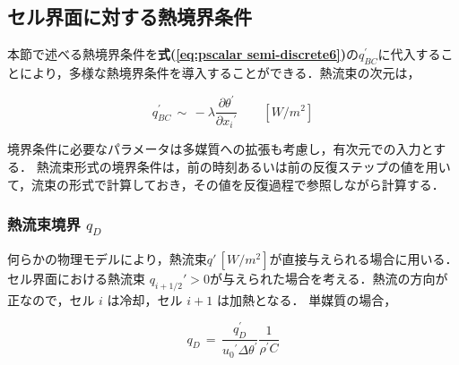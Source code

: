 %
\subsection{セル界面に対する熱境界条件}
本節で述べる熱境界条件を\textbf{式(\ref{eq:pscalar semi-discrete6})}の$q_{BC}^{\prime}$に代入することにより，多様な熱境界条件を導入することができる．熱流束の次元は，

\begin{equation}
q_{BC}^{\prime}\, \sim \, - \lambda \frac{\partial \theta^{\prime}}{\partial {x_{i}}^{\prime}} \qquad [W/m^2]
\label{eq:pscalar qbc}
\end{equation}

\noindent 境界条件に必要なパラメータは多媒質への拡張も考慮し，有次元での入力とする．
熱流束形式の境界条件は，前の時刻あるいは前の反復ステップの値を用いて，流束の形式で計算しておき，その値を反復過程で参照しながら計算する．


%
\subsubsection{熱流束境界 $q_D$}
何らかの物理モデルにより，熱流束$q'\,[W/m^2]$が直接与えられる場合に用いる．
セル界面における熱流束 $q_{i+1/2}' > 0$が与えられた場合を考える．熱流の方向が正なので，セル $i$ は冷却，セル $i+1$ は加熱となる．
単媒質の場合，

\begin{equation}
{q}_{D} \,=\, \frac{q_{D}^{\prime}}{{u_{\mathit{0}}}^{\prime} \Delta \theta^{\prime}} \frac{1}{\rho^{\prime}C}
\label{eq:qD}
\end{equation}

